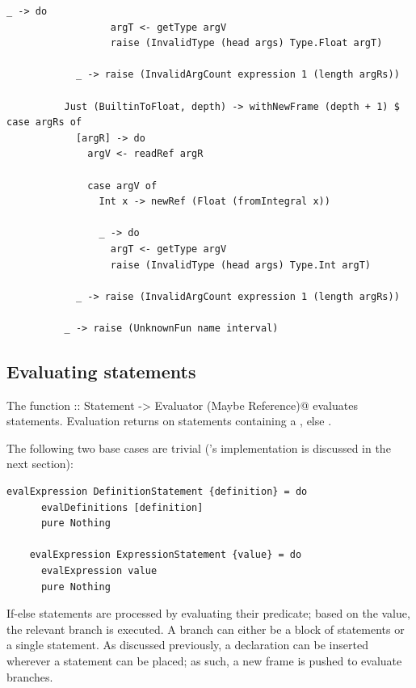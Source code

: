 \documentclass[UdineBachThesis,american,11pt]{PhdThesis}
\begin{document}
  \newpage

  \begin{lstlisting}[gobble=4,basicstyle=\ttfamily\small]
                _ -> do
                  argT <- getType argV
                  raise (InvalidType (head args) Type.Float argT)

            _ -> raise (InvalidArgCount expression 1 (length argRs))

          Just (BuiltinToFloat, depth) -> withNewFrame (depth + 1) $ case argRs of
            [argR] -> do
              argV <- readRef argR

              case argV of
                Int x -> newRef (Float (fromIntegral x))

                _ -> do
                  argT <- getType argV
                  raise (InvalidType (head args) Type.Int argT)

            _ -> raise (InvalidArgCount expression 1 (length argRs))

          _ -> raise (UnknownFun name interval)
  \end{lstlisting}

  \subsection{Evaluating statements}

  The function
  \lstinline@evalStatement :: Statement -> Evaluator (Maybe Reference)@
  evaluates statements. Evaluation returns \lstinline@Just@ on statements
  containing a \lstinline@return@, else \lstinline@Nothing@.

  The following two base cases are trivial (\lstinline@evalDefinitions@'s
  implementation is discussed in the next section):

  \begin{lstlisting}[gobble=4,basicstyle=\ttfamily\small]
    evalExpression DefinitionStatement {definition} = do
      evalDefinitions [definition]
      pure Nothing

    evalExpression ExpressionStatement {value} = do
      evalExpression value
      pure Nothing
  \end{lstlisting}

  If-else statements are processed by evaluating their predicate; based on the
  value, the relevant branch is executed. A branch can either be a block of
  statements or a single statement. As discussed previously, a declaration can
  be inserted wherever a statement can be placed; as such, a new frame is pushed
  to evaluate branches.
\end{document}
